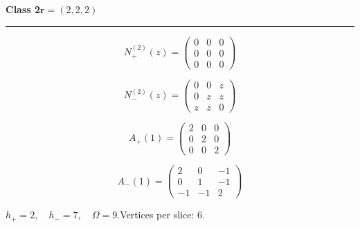 \noindent\begin{minipage}{\linewidth}
\noindent\textbf{Class 2}\hfill $\symbf{r}=(2,2,2)$
\par\smallskip\noindent\textcolor{rulegray}{\rule{\linewidth}{0.3pt}}
\begin{minipage}[c]{0.495\linewidth}\centering\fontsize{10.5}{13}\selectfont
\setlength{\abovedisplayskip}{3pt}\setlength{\belowdisplayskip}{3pt}
\setlength{\abovedisplayshortskip}{3pt}\setlength{\belowdisplayshortskip}{3pt}
\setlength{\arraycolsep}{3.5pt}\renewcommand{\arraystretch}{1.18}
\[N_{+}^{(2)}(z)=\begin{pmatrix}0 & 0 & 0\\0 & 0 & 0\\0 & 0 & 0\end{pmatrix}\]
\end{minipage}%
\begin{minipage}[c]{0.495\linewidth}\centering\fontsize{10.5}{13}\selectfont
\setlength{\abovedisplayskip}{3pt}\setlength{\belowdisplayskip}{3pt}
\setlength{\abovedisplayshortskip}{3pt}\setlength{\belowdisplayshortskip}{3pt}
\setlength{\arraycolsep}{3.5pt}\renewcommand{\arraystretch}{1.18}
\[N_{-}^{(2)}(z)=\begin{pmatrix}0 & 0 & z\\0 & z & z\\z & z & 0\end{pmatrix}\]
\end{minipage}%
\par\noindent
\begin{minipage}[c]{0.495\linewidth}\centering\fontsize{10.5}{13}\selectfont
\setlength{\abovedisplayskip}{3pt}\setlength{\belowdisplayskip}{3pt}
\setlength{\abovedisplayshortskip}{3pt}\setlength{\belowdisplayshortskip}{3pt}
\setlength{\arraycolsep}{3.5pt}\renewcommand{\arraystretch}{1.18}
\[A_{+}(1)=\begin{pmatrix}2 & 0 & 0\\0 & 2 & 0\\0 & 0 & 2\end{pmatrix}\]
\end{minipage}%
\begin{minipage}[c]{0.495\linewidth}\centering\fontsize{10.5}{13}\selectfont
\setlength{\abovedisplayskip}{3pt}\setlength{\belowdisplayskip}{3pt}
\setlength{\abovedisplayshortskip}{3pt}\setlength{\belowdisplayshortskip}{3pt}
\setlength{\arraycolsep}{3.5pt}\renewcommand{\arraystretch}{1.18}
\[A_{-}(1)=\begin{pmatrix}2 & 0 & -1\\0 & 1 & -1\\-1 & -1 & 2\end{pmatrix}\]
\end{minipage}%
\par\smallskip\noindent\small $h_+=2,\quad h_-=7,\quad \Omega=9.$\quad Vertices per slice: 6.
\end{minipage}\par\vfill
